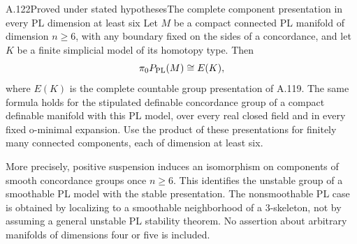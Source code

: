 \begin{saresult}{A.122}{Proved under stated hypotheses}{The complete component presentation in every PL dimension at least six}
Let $M$ be a compact connected PL manifold of dimension $n\geq6$,
with any boundary fixed on the sides of a concordance, and let $K$
be a finite simplicial model of its homotopy type. Then
\[
                   \pi_0P_{\rm PL}(M)\cong E(K),
\]
where $E(K)$ is the complete countable group presentation of
A.119. The same formula holds for the stipulated definable
concordance group of a compact definable manifold with this PL
model, over every real closed field and in every fixed o-minimal
expansion. Use the product of these presentations for finitely many
connected components, each of dimension at least six.

More precisely, positive suspension induces an isomorphism on
components of smooth concordance groups once $n\geq6$. This
identifies the unstable group of a smoothable PL model with the
stable presentation. The nonsmoothable PL case is obtained by
localizing to a smoothable neighborhood of a $3$-skeleton, not by
assuming a general unstable PL stability theorem. No assertion
about arbitrary manifolds of dimensions four or five is included.
\end{saresult}
